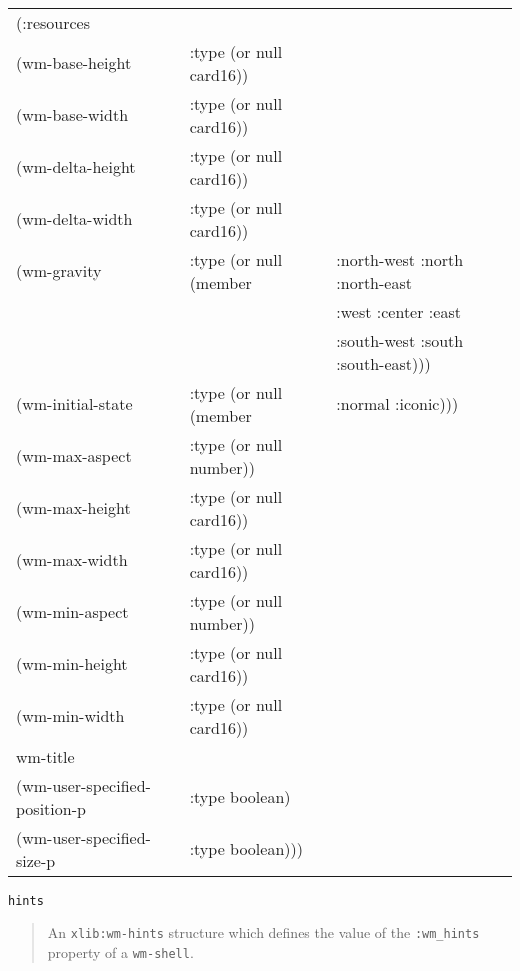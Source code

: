 \documentclass[twoside]{book}
\begin{document}
\begin{sloppy}
\begin{flushright} \parbox[t]{6.125in}{
\tt
\begin{tabular}{lll}
\raggedright
(:resources & & \\
    (wm-base-height   &:type (or null card16)) \\
    (wm-base-width    &:type (or null card16))              \\
    (wm-delta-height  &:type (or null card16))                  \\
    (wm-delta-width   &:type (or null card16))               \\
    (wm-gravity       &:type (or null (member &        :north-west :north  :north-east \\
&&                             		        :west       :center :east\\
&&                                     		:south-west :south  :south-east)))\\          
    (wm-initial-state &:type (or null (member &:normal :iconic))) \\
    (wm-max-aspect    &:type (or null number))              \\
    (wm-max-height    &:type (or null card16))              \\
    (wm-max-width     &:type (or null card16))             \\
    (wm-min-aspect    &:type (or null number))              \\
    (wm-min-height    &:type (or null card16))              \\
    (wm-min-width     &:type (or null card16))             \\
     wm-title\\
    (wm-user-specified-position-p &:type boolean) \\
    (wm-user-specified-size-p     &:type boolean))) \\
\end{tabular}
\rm
}\end{flushright}


\begin{flushright} \parbox[t]{6.125in}{
{\tt hints}
\begin{quote}
An {\tt xlib:wm-hints} structure which defines the value of the
{\tt :wm\_hints} property of a {\tt wm-shell}. 
\end{quote}

}\end{flushright}


\end{sloppy}
\end{document}
